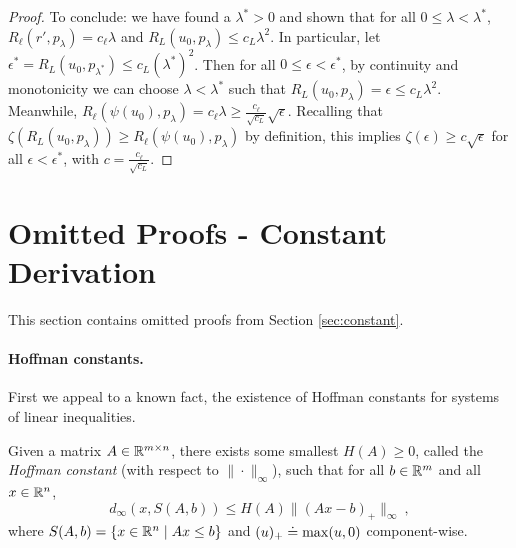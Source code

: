\begin{proof}
  To conclude: we have found a $\lambda^* > 0$ and shown that for all $0 \leq \lambda < \lambda^*$, $R_\ell(r',p_\lambda) = c_\ell \lambda$ and $R_L(u_0,p_\lambda) \leq c_L \lambda^2$.
  In particular, let $\epsilon^* = R_L(u_0, p_{\lambda^*}) \leq c_L (\lambda^*)^2$.
  Then for all $0 \leq \epsilon < \epsilon^*$,
  by continuity and monotonicity we can choose $\lambda < \lambda^*$ such that $R_L(u_0, p_{\lambda}) = \epsilon \leq c_L \lambda^2$.
  Meanwhile, $R_{\ell}(\psi(u_0), p_{\lambda}) = c_{\ell} \lambda \geq \frac{c_{\ell}}{\sqrt{c_L}} \sqrt{\epsilon}$.
  Recalling that $\zeta(R_L(u_0, p_{\lambda})) \geq R_{\ell}(\psi(u_0), p_{\lambda})$ by definition,
  this implies $\zeta(\epsilon) \geq c \sqrt{\epsilon}$ for all $\epsilon < \epsilon^*$, with $c = \frac{c_{\ell}}{\sqrt{c_L}}$.
\end{proof}


\section{Omitted Proofs - Constant Derivation} \label{app:constant}
This section contains omitted proofs from Section \ref{sec:constant}.

\paragraph{Hoffman constants.}
First we appeal to a known fact, the existence of Hoffman constants for systems of linear inequalities.
\begin{theorem}
  \label{thm:hoffman}
  Given a matrix $A\in\mathbb{R}^{m\times n}$, there exists some smallest $H(A)\geq 0$, called the \emph{Hoffman constant} (with respect to $\|\cdot\|_\infty$), such that for all $b\in\mathbb{R}^m$ and all $x\in\mathbb{R}^n$,
  \begin{equation}
    \label{eq:hoffman}
    d_\infty(x,S(A,b)) \leq H(A) \|(A x - b)_+\|_\infty~,
  \end{equation}
  where $S(A,b) = \{x\in\mathbb{R}^n \mid A x \leq b\}$ and $(u)_+ \doteq \max(u,0)$ component-wise.
\end{theorem}

